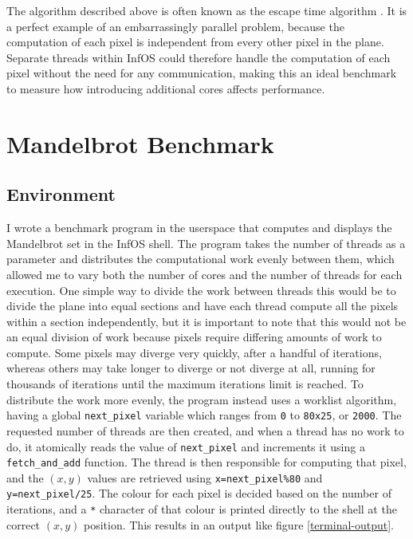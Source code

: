 \documentclass[bsc,frontabs,singlespacing,parskip,deptreport]{infthesis}
\begin{document}
The algorithm described above is often known as the escape time algorithm \cite{mandelbrot-plotting-algorithms}. It is a perfect example of an embarrassingly parallel problem, because the computation of each pixel is independent from every other pixel in the plane. Separate threads within InfOS could therefore handle the computation of each pixel without the need for any communication, making this an ideal benchmark to measure how introducing additional cores affects performance.

\section{Mandelbrot Benchmark} \label{mb-benchmark}
\subsection{Environment} 
I wrote a benchmark program in the userspace that computes and displays the Mandelbrot set in the InfOS shell. The program takes the number of threads as a parameter and distributes the computational work evenly between them, which allowed me to vary both the number of cores and the number of threads for each execution. One simple way to divide the work between threads this would be to divide the plane into equal sections and have each thread compute all the pixels within a section independently, but it is important to note that this would not be an equal division of work because pixels require differing amounts of work to compute. Some pixels may diverge very quickly, after a handful of iterations, whereas others may take longer to diverge or not diverge at all, running for thousands of iterations until the maximum iterations limit is reached. To distribute the work more evenly, the program instead uses a worklist algorithm, having a global \verb|next_pixel| variable which ranges from \verb|0| to \verb|80x25|, or \verb|2000|. The requested number of threads are then created, and when a thread has no work to do, it atomically reads the value of \verb|next_pixel| and increments it using a \verb|fetch_and_add| function. The thread is then responsible for computing that pixel, and the $(x,y)$ values are retrieved using \verb|x=next_pixel%80| and \verb|y=next_pixel/25|. The colour for each pixel is decided based on the number of iterations, and a \verb|*| character of that colour is printed directly to the shell at the correct $(x,y)$ position. This results in an output like figure \ref{terminal-output}.
\end{document}
